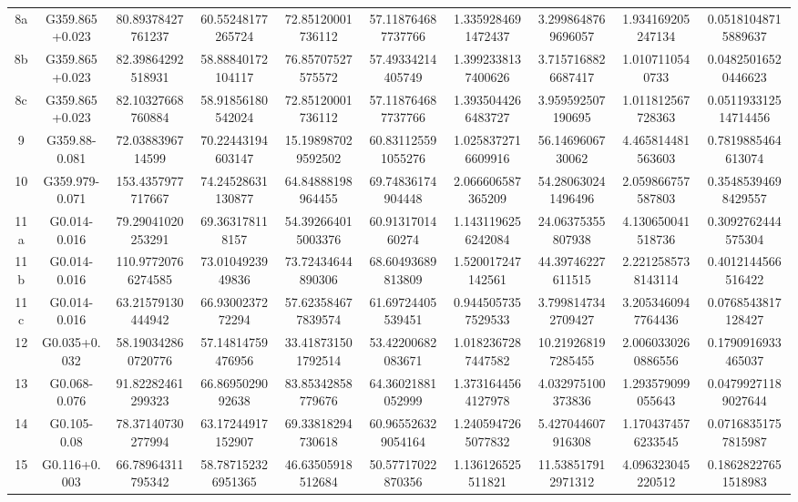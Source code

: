 \begin{table}
\begin{tabular}{cccccccccc}
8a & G359.865+0.023 & 80.89378427761237 & 60.55248177265724 & 72.85120001736112 & 57.118764687737766 & 1.3359284691472437 & 3.2998648769696057 & 1.934169205247134 & 0.05181048715889637 \\
8b & G359.865+0.023 & 82.39864292518931 & 58.88840172104117 & 76.85707527575572 & 57.49334214405749 & 1.3992338137400626 & 3.7157168826687417 & 1.0107110540733 & 0.04825016520446623 \\
8c & G359.865+0.023 & 82.10327668760884 & 58.91856180542024 & 72.85120001736112 & 57.118764687737766 & 1.3935044266483727 & 3.959592507190695 & 1.011812567728363 & 0.051193312514714456 \\
9 & G359.88-0.081 & 72.0388396714599 & 70.22443194603147 & 15.198987029592502 & 60.831125591055276 & 1.0258372716609916 & 56.1469606730062 & 4.465814481563603 & 0.7819885464613074 \\
10 & G359.979-0.071 & 153.4357977717667 & 74.24528631130877 & 64.84888198964455 & 69.74836174904448 & 2.066606587365209 & 54.280630241496496 & 2.059866757587803 & 0.35485394698429557 \\
11a & G0.014-0.016 & 79.29041020253291 & 69.363178118157 & 54.392664015003376 & 60.9131701460274 & 1.1431196256242084 & 24.06375355807938 & 4.130650041518736 & 0.3092762444575304 \\
11b & G0.014-0.016 & 110.97720766274585 & 73.0104923949836 & 73.72434644890306 & 68.60493689813809 & 1.520017247142561 & 44.39746227611515 & 2.2212585738143114 & 0.4012144566516422 \\
11c & G0.014-0.016 & 63.21579130444942 & 66.9300237272294 & 57.623584677839574 & 61.69724405539451 & 0.9445057357529533 & 3.7998147342709427 & 3.2053460947764436 & 0.0768543817128427 \\
12 & G0.035+0.032 & 58.190342860720776 & 57.14814759476956 & 33.418731501792514 & 53.42200682083671 & 1.0182367287447582 & 10.219268197285455 & 2.0060330260886556 & 0.1790916933465037 \\
13 & G0.068-0.076 & 91.82282461299323 & 66.8695029092638 & 83.85342858779676 & 64.36021881052999 & 1.3731644564127978 & 4.032975100373836 & 1.293579099055643 & 0.04799271189027644 \\
14 & G0.105-0.08 & 78.37140730277994 & 63.17244917152907 & 69.33818294730618 & 60.965526329054164 & 1.2405947265077832 & 5.427044607916308 & 1.1704374576233545 & 0.07168351757815987 \\
15 & G0.116+0.003 & 66.78964311795342 & 58.787152326951365 & 46.63505918512684 & 50.57717022870356 & 1.136126525511821 & 11.538517912971312 & 4.096323045220512 & 0.18628227651518983 \\

\end{tabular}
\end{table}
